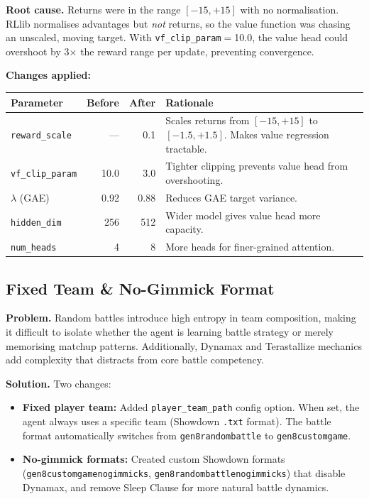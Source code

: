 \textbf{Root cause.} Returns were in the range $[-15, +15]$ with no
normalisation.  RLlib normalises advantages but \emph{not} returns, so the
value function was chasing an unscaled, moving target.  With
\texttt{vf\_clip\_param}$=$10.0, the value head could overshoot by 3$\times$
the reward range per update, preventing convergence.

\textbf{Changes applied:}

\begin{center}
\small
\begin{tabularx}{\textwidth}{l r r X}
  \toprule
  \textbf{Parameter} & \textbf{Before} & \textbf{After} & \textbf{Rationale} \\
  \midrule
  \texttt{reward\_scale} & --- & 0.1 &
    Scales returns from $[-15,+15]$ to $[-1.5,+1.5]$.  Makes value
    regression tractable. \\
  \texttt{vf\_clip\_param} & 10.0 & 3.0 &
    Tighter clipping prevents value head from overshooting. \\
  $\lambda$ (GAE) & 0.92 & 0.88 &
    Reduces GAE target variance. \\
  \texttt{hidden\_dim} & 256 & 512 &
    Wider model gives value head more capacity. \\
  \texttt{num\_heads} & 4 & 8 &
    More heads for finer-grained attention. \\
  \bottomrule
\end{tabularx}
\end{center}

\subsection{Fixed Team \& No-Gimmick Format}

\textbf{Problem.} Random battles introduce high entropy in team composition,
making it difficult to isolate whether the agent is learning battle strategy
or merely memorising matchup patterns.  Additionally, Dynamax and Terastallize
mechanics add complexity that distracts from core battle competency.

\textbf{Solution.} Two changes:
\begin{itemize}
  \item \textbf{Fixed player team:} Added \texttt{player\_team\_path} config
        option.  When set, the agent always uses a specific team (Showdown
        \texttt{.txt} format).  The battle format automatically switches from
        \texttt{gen8randombattle} to \texttt{gen8customgame}.
  \item \textbf{No-gimmick formats:} Created custom Showdown formats
        (\texttt{gen8customgamenogimmicks},
        \texttt{gen8randombattlenogimmicks}) that disable Dynamax, and remove
        Sleep Clause for more natural battle dynamics.
\end{itemize}

